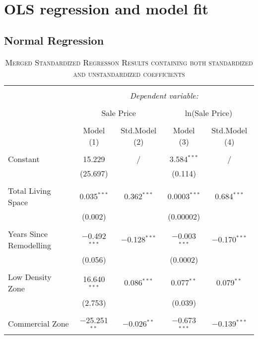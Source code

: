 \documentclass[a4paper]{article}
\begin{document}
\section{OLS regression and model fit}
\subsection{Normal Regression}



\begin{table}[!htbp] \centering 
\begin{adjustwidth}{-0.0cm}{-0cm}
\begin{threeparttable}
\small
\captionsetup{font=small, justification=raggedright,singlelinecheck=false}
\caption{\textsc{Merged Standardized Regresson Results containing both standardized and unstandardized coefficients}}
\centering 
  \label{}
\small 
\begin{tabular}{@{\extracolsep{-1pt}}lcccc} 
\\[-5.8ex]\hline 
\hline \\[-1.8ex] 
 & \multicolumn{4}{c}{\textit{Dependent variable:}} \\ 
\cline{2-5} 
\\[-1.8ex] & \multicolumn{2}{c}{Sale Price} & \multicolumn{2}{c}{ln(Sale Price)} \\ 
\\[-1.8ex] & Model (1) & Std.Model (2) & Model (3) & Std.Model (4)\\ 
\hline \\[-1.8ex] 
 Constant & 15.229 & / & 3.584$^{***}$ & / \\ 
  & (25.697) &  & (0.114) &  \\ 
  & & & & \\ 
 Total Living Space & 0.035$^{***}$ & 0.362$^{***}$ & 0.0003$^{***}$ & 0.684$^{***}$ \\ 
  & (0.002) &  & (0.00002) &  \\ 
  & & & & \\ 
 Years Since Remodelling & $-$0.492$^{***}$ & $-$0.128$^{***}$ & $-$0.003$^{***}$ & $-$0.170$^{***}$ \\ 
  & (0.056) &  & (0.0002) &  \\ 
  & & & & \\ 
 Low Density Zone & 16.640$^{***}$ & 0.086$^{***}$ & 0.077$^{**}$ & 0.079$^{**}$ \\ 
  & (2.753) &  & (0.039) &  \\ 
  & & & & \\ 
 Commercial Zone & $-$25.251$^{**}$ & $-$0.026$^{**}$ & $-$0.673$^{***}$ & $-$0.139$^{***}$ \\ 

\end{tabular}
\end{threeparttable}
\end{adjustwidth}
\end{table}
\end{document}
